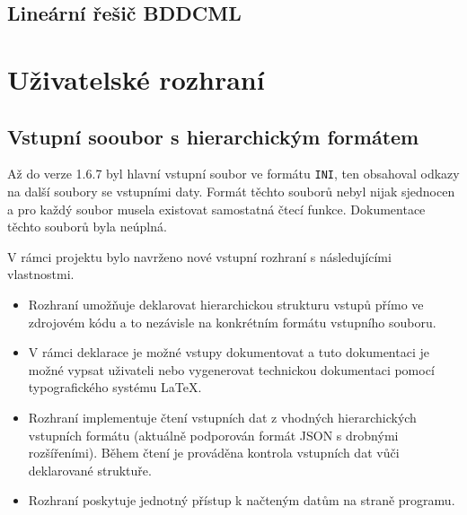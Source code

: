 \documentclass[11pt]{report}
\begin{document}
\subsection{Lineární řešič BDDCML}




\section{Uživatelské rozhraní}
\subsection{Vstupní sooubor s hierarchickým formátem}
Až do verze 1.6.7 byl hlavní vstupní soubor ve formátu \verb'INI', 
ten obsahoval odkazy na další soubory se vstupními daty. Formát těchto souborů 
nebyl nijak sjednocen a pro každý soubor musela existovat samostatná čtecí 
funkce. Dokumentace těchto souborů byla neúplná.

V rámci projektu bylo navrženo nové vstupní rozhraní s následujícími 
vlastnostmi.
\begin{itemize}
\item Rozhraní umožňuje deklarovat hierarchickou strukturu vstupů 
přímo ve zdrojovém kódu a to nezávisle na konkrétním formátu vstupního souboru.
%
\item V rámci deklarace je možné vstupy dokumentovat a tuto dokumentaci je 
možné vypsat uživateli nebo vygenerovat technickou dokumentaci pomocí 
typografického systému \LaTeX.
%
\item Rozhraní implementuje čtení vstupních dat z 
vhodných hierarchických vstupních formátu (aktuálně podporován formát JSON s 
drobnými rozšířeními). Během čtení je prováděna kontrola vstupních dat vůči 
deklarované struktuře.
%
\item Rozhraní poskytuje jednotný přístup k načteným datům na straně programu. 
\end{itemize}
\end{document}

